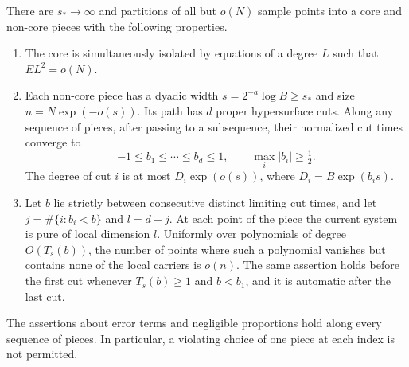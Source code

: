 \begin{proposition}\label{prop:prof-partition}
There are $s_*\to\infty$ and partitions of all but $o(N)$ sample points into a core and non-core pieces with the following properties.
\begin{enumerate}
\item The core is simultaneously isolated by equations of a degree $L$
such that $EL^2=o(N)$.
\item Each non-core piece has a dyadic width
$s=2^{-a}\log B\ge s_*$ and size $n=N\exp(-o(s))$.  Its path has $d$ proper hypersurface cuts.  Along any sequence of pieces, after passing to a subsequence, their normalized cut times converge to
\[
 -1\le b_1\le\cdots\le b_d\le1,\qquad
 \max_i|b_i|\ge\tfrac12.
\]
The degree of cut $i$ is at most $D_i\exp(o(s))$, where $D_i=B\exp(b_i s)$.
\item Let $b$ lie strictly between consecutive distinct limiting cut
times, and let $j=\#\{i:b_i<b\}$ and $l=d-j$.  At each point of the piece the current system is pure of local dimension $l$.  Uniformly over polynomials of degree $O(T_s(b))$, the number of points where such a polynomial vanishes but contains none of the local carriers is $o(n)$.  The same assertion holds before the first cut whenever $T_s(b)\ge1$ and $b<b_1$, and it is automatic after the last cut.
\end{enumerate}
The assertions about error terms and negligible proportions hold along every sequence of pieces.  In particular, a violating choice of one piece at each index is not permitted.
\end{proposition}

